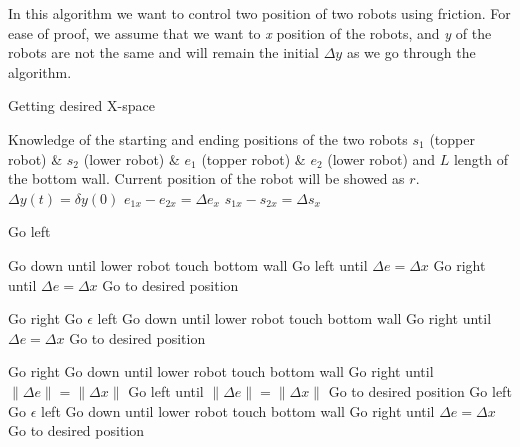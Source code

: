 In this algorithm we want to control two position of two robots using friction. For ease of proof, we assume that we want to \emph{x} position of the robots, and \emph{y} of the robots are not the same and will remain the initial $\Delta y $ as we go through the algorithm.
\begin{algorithm}
\caption{Getting desired X-space}\label{alg:CovarianceControl}
\begin{algorithmic}[1]
\Require Knowledge of the starting and ending positions  of the two robots $s_1$ (topper robot) \& $s_2$ (lower robot)  \& $e_1$ (topper robot) \& $e_2$ (lower robot) and $L$ length of the bottom wall. Current position of the robot will be showed as $r$.
\Ensure $\Delta y(t) = \delta y(0)$ 
\State $e_{1x} - e_{2x} = \Delta e_x$
\State $s_{1x} - s_{2x} = \Delta s_x$
\Loop

\State Go left
\EndWhile

\State Go down until lower robot touch bottom wall
\State Go left until $\Delta e = \Delta x$
\Else Go right until $\Delta e = \Delta x$
\EndIf
\State Go to desired position
\EndIf

\State Go right
\EndWhile
{}
\State Go $\epsilon$ left 
\EndIf
\State Go down until lower robot touch bottom wall
\State Go right until $\Delta e = \Delta x$
\State Go to desired position
\EndIf

\State Go right
\EndWhile
\State Go down until lower robot touch bottom wall
\State Go right until $\|\Delta e\| = \|\Delta x\|$
\Else Go left until $\|\Delta e\| = \|\Delta x\|$
\EndIf
\State Go to desired position
\EndIf
\newpage
{}
\State Go left
\EndWhile
{}
\State Go $\epsilon$ left 
\EndIf
\State Go down until lower robot touch bottom wall
\State Go right until $\Delta e = \Delta x$
\State Go to desired position
\EndIf

\EndLoop
\end{algorithmic}
\end{algorithm}


